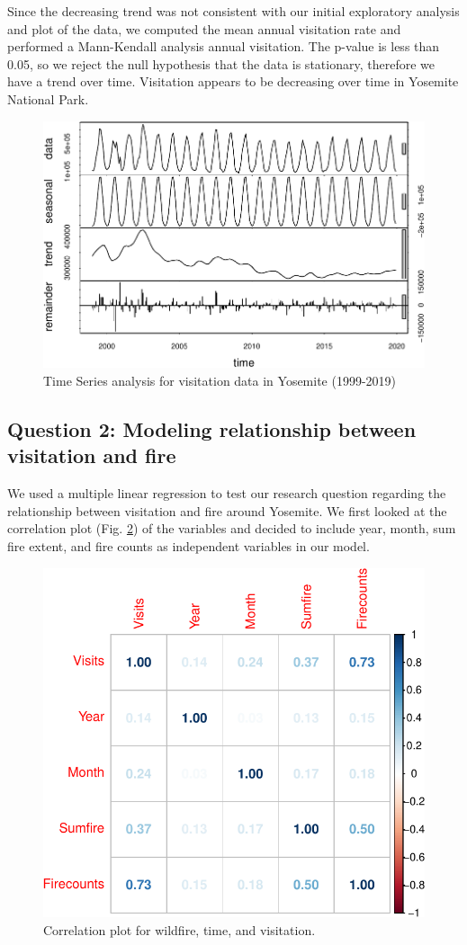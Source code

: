 \documentclass[
  12pt,
]{article}
\begin{document}
Since the decreasing trend was not consistent with our initial exploratory analysis and plot of the data, we computed the mean annual visitation rate and performed a Mann-Kendall analysis annual visitation. The p-value is less than 0.05, so we reject the null hypothesis that the data is stationary, therefore we have a trend over time. Visitation appears to be decreasing over time in Yosemite National Park.

\begin{figure}

{\centering \includegraphics[width=0.6\linewidth]{CodeFinal_files/figure-latex/TSplotvisit-1} 

}

\caption{Time Series analysis for visitation data in Yosemite (1999-2019)}\label{fig:TSplotvisit}
\end{figure}

\hypertarget{question-2-modeling-relationship-between-visitation-and-fire}{%
\subsection{Question 2: Modeling relationship between visitation and fire}\label{question-2-modeling-relationship-between-visitation-and-fire}}

We used a multiple linear regression to test our research question regarding the relationship between visitation and fire around Yosemite. We first looked at the correlation plot (Fig. \ref{fig:corrplot}) of the variables and decided to include year, month, sum fire extent, and fire counts as independent variables in our model.

\begin{figure}

{\centering \includegraphics[width=0.6\linewidth]{CodeFinal_files/figure-latex/corrplot-1} 

}

\caption{Correlation plot for wildfire, time, and visitation.}\label{fig:corrplot}
\end{figure}
\end{document}
